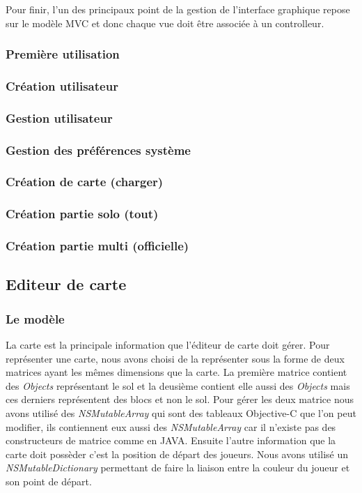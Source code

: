 	Pour finir, l'un des principaux point de la gestion de l'interface graphique repose sur le modèle MVC et donc chaque vue doit être associée à un controlleur.
				
	\subsubsection{Première utilisation}
	\subsubsection{Création utilisateur}
	\subsubsection{Gestion utilisateur}
	\subsubsection{Gestion des préférences système}
	\subsubsection{Création de carte (charger)}
	\subsubsection{Création partie solo (tout)}
	\subsubsection{Création partie multi (officielle)}
			

\subsection{Editeur de carte}

	\hypertarget{Editeur de carte}{}
	\label{Editeur de carte}

	\subsubsection{Le modèle}
		La carte est la principale information que l'éditeur de carte doit gérer. Pour représenter une carte, nous avons choisi de la représenter sous la forme de deux matrices ayant les mêmes dimensions que la carte. La première matrice contient des \textit{Objects} représentant le sol et la deusième contient elle aussi des \textit{Objects} mais ces derniers représentent des blocs et non le sol. Pour gérer les deux matrice nous avons utilisé des \textit{NSMutableArray} qui sont des tableaux Objective-C que l'on peut modifier, ils contiennent eux aussi des \textit{NSMutableArray} car il n'existe pas des constructeurs de matrice comme en JAVA. Ensuite l'autre information que la carte doit possèder c'est la position de départ des joueurs. Nous avons utilisé un \textit{NSMutableDictionary} permettant de faire la liaison entre la couleur du joueur et son point de départ. 
			
